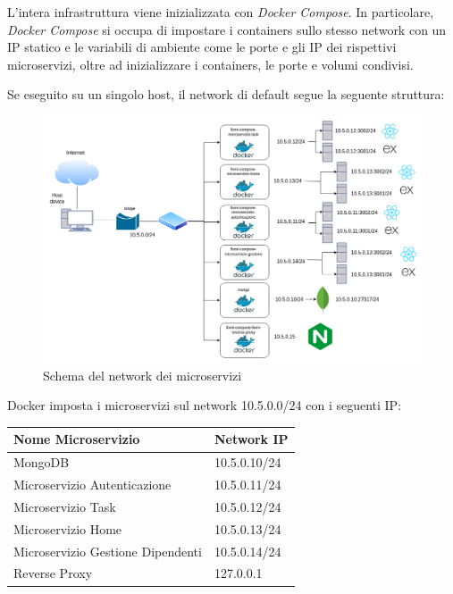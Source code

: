\documentclass{report}
\begin{document}
L'intera infrastruttura viene inizializzata con \textit{Docker Compose}. In particolare, \textit{Docker Compose} si occupa di impostare i containers sullo stesso network con un IP statico e le variabili di ambiente come le porte e gli IP dei rispettivi microservizi, oltre ad inizializzare i containers, le porte e volumi condivisi.

Se eseguito su un singolo host, il network di default segue la seguente struttura:
\begin{figure}[H]
	\centering\includegraphics[width=1\textwidth]{images/network.png}
	Schema del network dei microservizi
\end{figure}

Docker imposta i microservizi sul network 10.5.0.0/24 con i seguenti IP:
\begin{center} %
	\centering
	\begin{tabular}{ |p{4cm}|p{4cm}|  }
		\hline
		\centering Nome Microservizio     & \qquad\quad Network IP \\ %
		\hline
		MongoDB                           & 10.5.0.10/24           \\
		\hline
		Microservizio Autenticazione      & 10.5.0.11/24           \\
		\hline
		Microservizio Task                & 10.5.0.12/24           \\
		\hline
		Microservizio Home                & 10.5.0.13/24           \\
		\hline
		Microservizio Gestione Dipendenti & 10.5.0.14/24           \\
		\hline
		Reverse Proxy                     & 127.0.0.1              \\
		\hline
	\end{tabular}
\end{center}
\end{document}
